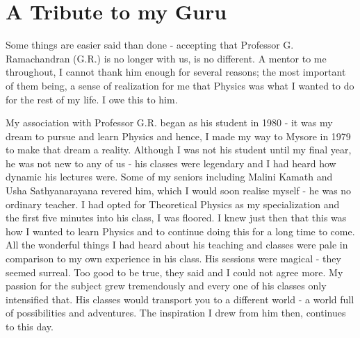 \chapter{A Tribute to my Guru}


Some things are easier said than done - accepting that Professor G. Ramachandran
(G.R.) is no longer with us, is no different. A mentor to me throughout, I cannot thank
him enough for several reasons; the most important of them being, a sense of realization for me that Physics was what I wanted to do for the rest of my life. I owe this to him.

My association with Professor G.R. began as his student in 1980 - it was my dream
to pursue and learn Physics and hence, I made my way to Mysore in 1979 to make that
dream a reality. Although I was not his student until my final year, he was not new to
any of us - his classes were legendary and I had heard how dynamic his lectures were.
Some of my seniors including Malini Kamath and Usha Sathyanarayana revered him,
which I would soon realise myself - he was no ordinary teacher. I had opted for Theoretical Physics as my specialization and the first five minutes into his class, I was floored.
I knew just then that this was how I wanted to learn Physics and to continue doing this
for a long time to come. All the wonderful things I had heard about his teaching and
classes were pale in comparison to my own experience in his class. His sessions were
magical - they seemed surreal. Too good to be true, they said and I could not agree
more. My passion for the subject grew tremendously and every one of his classes only
intensified that. His classes would transport you to a different world - a world full of
possibilities and adventures. The inspiration I drew from him then, continues to this day.

